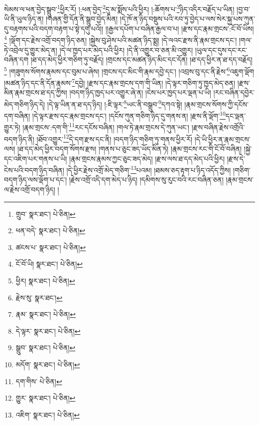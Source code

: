 སེམས་ལ་ཕན་བྱེད་སྒྲུབ་\footnote{གྲུབ་  སྣར་ཐང་།  པེ་ཅིན། }ཕྱིར་རོ། །:ཕན་བྱེད་\footnote{ཕན་བདེ་  སྣར་ཐང་།  པེ་ཅིན། }དུ་མ་སྨོས་པའི་ཕྱིར། །:ཆོགས་པ་\footnote{ཚངས་པ་  སྣར་ཐང་།  པེ་ཅིན། }ཉིད་འདིར་བརྗོད་པ་ཡིན། །བྱ་བ་ཡི་ནི་ཡུལ་ཉིད་ན། །གཞན་གྱི་དོན་ནི་སྒྲུབ་བྱེད་མིན། །དེ་ཁོ་ན་ཉིད་བསྡུས་པའི་རབ་ཏུ་བྱེད་པ་ལས་སེར་སྐྱ་པས་ཀུན་དུ་བརྟགས་པའི་བདག་བརྟག་པ་སྟེ་དགུ་པའོ།། །།རྒྱལ་དཔོག་པ་བཞིན་རྒྱལ་བ་པ། །རྫས་དང་རྣམ་གྲངས་:ངོ་བོ་ཡིས།\footnote{ངོ་བོ་ཡི།  སྣར་ཐང་།  པེ་ཅིན། } །ལྡོག་དང་རྗེས་འགྲོ་བདག་ཉིད་ཅན། །སྐྱེས་བུ་ཤེས་པའི་མཚན་ཉིད་སྨྲ། །དེ་ལའང་རྫས་ནི་རྣམ་གྲངས་དང་། །གལ་ཏེ་འབྲེལ་དུ་གྱུར་མེད་ན། །དེ་ལ་ཁྱད་པར་མེད་པའི་ཕྱིར། །དེ་ནི་འགྱུར་བ་ཅན་མི་འགྱུར། །ཡུལ་དང་དུས་དང་རང་བཞིན་དག །ཐ་དད་མེད་ཕྱིར་གཅིག་ཏུ་བརྗོད། །གྲངས་དང་མཚན་ཉིད་མིང་དང་དོན། །ཐ་དད་ཕྱིར་ན་ཐ་དད་བརྗོད།\footnote{ཕྱིར།  སྣར་ཐང་།  པེ་ཅིན། } །གཟུགས་སོགས་རྣམས་དང་བུམ་པ་ཞེས། །གྲངས་དང་མིང་གི་རྣམ་དབྱེ་དང་། །འབྲས་བུ་དང་ནི་རྗེས་\footnote{རྗེས་སུ་  སྣར་ཐང་། }འཇུག་ལྡོག །མཚན་ཉིད་དང་ནི་དོན་རྣམས་\footnote{རྣམ་  སྣར་ཐང་།  པེ་ཅིན། }དབྱེ། །རྫས་དང་རྣམ་གྲངས་དག་གི་ཡིན། །དེ་ལྟར་གཅིག་ཏུ་ཁྱད་མེད་ཅན། །རྫས་མིན་རྣམ་གྲངས་ཐ་དད་ཀྱིས། །བདག་ཉིད་ཁྱད་པར་འགྱུར་ཞེ་ན། །ངེས་པར་ཁྱད་པར་ལྡན་པ་ཡི། །རང་བཞིན་དབྱེར་མེད་གཅིག་ཉིད་དེ། །དེ་ལྟ་ཡིན་ན་ཐ་དད་ཉིད། །:ཇི་ལྟར་\footnote{དེ་ལྟར་  སྣར་ཐང་།  པེ་ཅིན། }ཡང་ནི་བསྒྲུབ་\footnote{སྒྲུབ་  སྣར་ཐང་།  པེ་ཅིན། }དཀའ་སྟེ། །རྣམ་གྲངས་སོགས་ཀྱི་དངོས་དག་བཞིན། །དེ་ལྟར་རྫས་དང་རྣམ་གྲངས་དང་། །དངོས་ཀུན་གཅིག་ཉིད་དུ་གནས་ན། །རྫས་ནི་ལྡོག་\footnote{མདོག་  སྣར་ཐང་།  པེ་ཅིན། }དང་ལྡན་གྱུར་ཏེ། །རྣམ་གྲངས་:དག་གི་\footnote{དག་གིས་  པེ་ཅིན། }རང་དངོས་བཞིན། །གལ་ཏེ་རྣམ་གྲངས་དེ་ཀུན་ཡང་། །རྫས་བཞིན་རྗེས་འགྲོའི་བདག་ཉིད་ནི། །ཐོབ་འགྱུར་\footnote{གྱུར་  སྣར་ཐང་།  པེ་ཅིན། }དེ་དག་རྫས་དང་ནི། །བདག་ཉིད་གཅིག་ཏུ་གནས་ཕྱིར་རོ། །དེ་ཡི་ཕྱིར་ན་རྣམ་གྲངས་ལས། །ཐ་དད་མེད་ཕྱིར་བདག་སོགས་རྫས། །གནས་པ་ཅུང་ཟད་ཡོད་མིན་ཏེ། །རྣམ་གྲངས་རང་གི་ངོ་བོ་བཞིན། །སྐྱེ་དང་འཇིག་པར་གནས་པ་ཡི། །རྣམ་གྲངས་རྣམས་ཀྱང་ཅུང་ཟད་མེད། །རྫས་ལས་ཐ་དད་མེད་པའི་ཕྱིར། །རྫས་དེ་ངེས་པའི་བདག་ཉིད་བཞིན། །དེ་ཕྱིར་རྗེས་འགྲོ་མེད་གཅིག་\footnote{འཇིག་  སྣར་ཐང་།  པེ་ཅིན། }པའམ། །ཐམས་ཅད་རྟག་པ་ཉིད་འདོད་ཀྱིས། །གཅིག་བདག་ཉིད་ལས་ལྡོག་པ་དང་། །རྗེས་འགྲོ་འདི་དག་མེད་པ་ཉིད། །དམིགས་སུ་རུང་བའི་རང་བཞིན་ཅན། །རྣམ་གྲངས་ལ་རྗེས་འགྲོ་བདག་ཉིད། །
